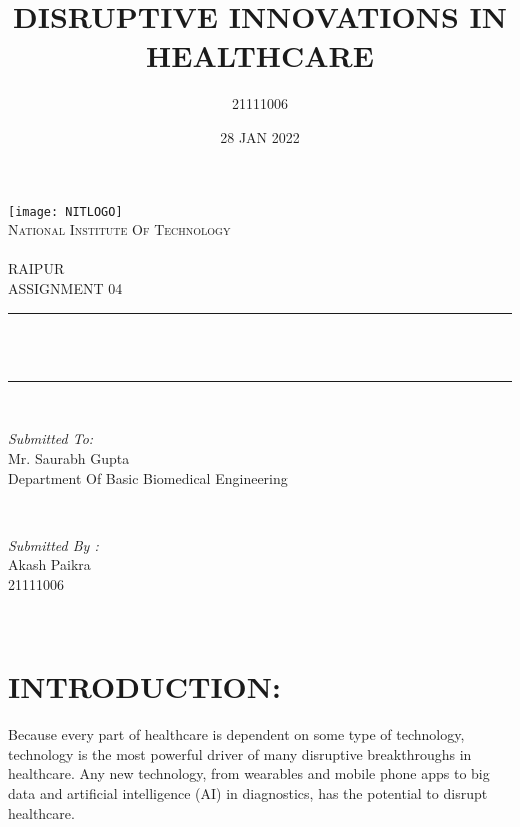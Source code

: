\documentclass[12pt]{article}
\title{DISRUPTIVE INNOVATIONS IN HEALTHCARE}\newline \\\\\\
\author{21111006}
\date{28 JAN 2022}
\makeatletter
\let\thetitle\@title
\makeatother
\begin{document}
\begin{titlepage}
	\centering
    \texttt{[image: NITLOGO]}\\[1.0 cm]	
    \textsc{\LARGE National Institute Of Technology \newline\\\\ RAIPUR}\\[2.0 CM]
    
	\textsc{\Large ASSIGNMENT 04}\\[0.5 cm]				%
	\rule{\linewidth}{0.4 mm} \\[0.4 cm]
	{ \huge \bfseries \thetitle}\\
	\rule{\linewidth}{0.4 mm} \\[1.5 cm]
	
	\begin{minipage}{0.6\textwidth}
		\begin{flushleft} \large
			\emph{Submitted To:}\\
			Mr. Saurabh Gupta\\
            Department Of Basic Biomedical Engineering\\
			\end{flushleft}
			\end{minipage}~
			\begin{minipage}{0.4\textwidth}
            
			\begin{flushright} \large
			\emph{Submitted By :}\\
			Akash Paikra\\
            21111006\\
		\end{flushright}
        
	\end{minipage}\\[2 cm]
\end{titlepage}

\tableofcontents
\pagebreak







\section{INTRODUCTION:}
Because every part of healthcare is dependent on some type of technology, technology is the most powerful driver of many disruptive breakthroughs in healthcare. Any new technology, from wearables and mobile phone apps to big data and artificial intelligence (AI) in diagnostics, has the potential to disrupt healthcare.
\end{document}
